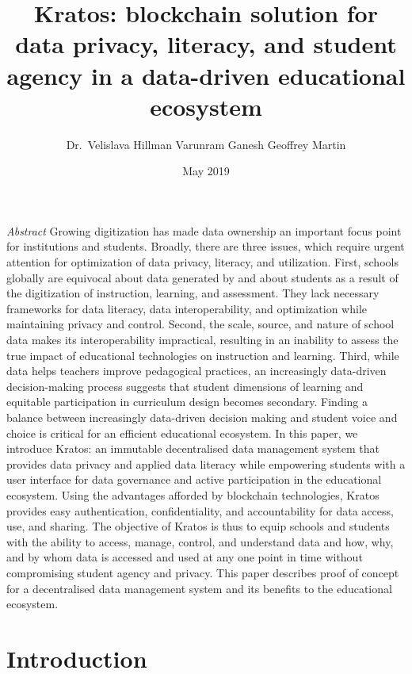 \documentclass{article}
\title{Kratos: blockchain solution for data privacy, literacy, and student agency in a data-driven educational ecosystem}
\author{Dr.\ Velislava Hillman \quad Varunram Ganesh \quad Geoffrey Martin}
\date{May 2019}
\begin{document}
\maketitle

\textit{Abstract}
Growing digitization has made data ownership an important focus point for institutions and students. Broadly, there are three issues, which require urgent attention for optimization of data privacy, literacy, and utilization. First, schools globally are equivocal about data generated by and about students as a result of the digitization of instruction, learning, and assessment. They lack necessary frameworks for data literacy, data interoperability, and optimization while maintaining privacy and control. Second, the scale, source, and nature of school data makes its interoperability impractical, resulting in an inability to assess the true impact of educational technologies on instruction and learning. Third, while data helps teachers improve pedagogical practices, an increasingly data-driven decision-making process suggests that student dimensions of learning and equitable participation in curriculum design becomes secondary. Finding a balance between increasingly data-driven decision making and student voice and choice is critical for an efficient educational ecosystem. In this paper, we introduce Kratos: an immutable decentralised data management system that provides data privacy and applied data literacy while empowering students with a user interface for data governance and active participation in the educational ecosystem. Using the advantages afforded by blockchain technologies, Kratos provides easy authentication, confidentiality, and accountability for data access, use, and sharing. The objective of Kratos is thus to equip schools and students with the ability to access, manage, control, and understand data and how, why, and by whom data is accessed and used at any one point in time without compromising student agency and privacy. This paper describes proof of concept for a decentralised data management system and its benefits to the educational ecosystem.
\bigbreak

\section{Introduction}
\end{document}
